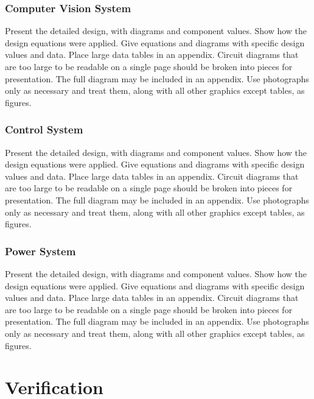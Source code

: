 \documentclass{report}
\begin{document}
    \subsection{Computer Vision System}
    Present the detailed design, with diagrams and component values. Show how the design equations were applied. Give equations and diagrams with specific design values and data. Place large data tables in an appendix. Circuit diagrams that are too large to be readable on a single page should be broken into pieces for presentation. The full diagram may be included in an appendix. Use photographs only as necessary and treat them, along with all other graphics except tables, as figures.

    \subsection{Control System}
    Present the detailed design, with diagrams and component values. Show how the design equations were applied. Give equations and diagrams with specific design values and data. Place large data tables in an appendix. Circuit diagrams that are too large to be readable on a single page should be broken into pieces for presentation. The full diagram may be included in an appendix. Use photographs only as necessary and treat them, along with all other graphics except tables, as figures.  

    \subsection{Power System}
    Present the detailed design, with diagrams and component values. Show how the design equations were applied. Give equations and diagrams with specific design values and data. Place large data tables in an appendix. Circuit diagrams that are too large to be readable on a single page should be broken into pieces for presentation. The full diagram may be included in an appendix. Use photographs only as necessary and treat them, along with all other graphics except tables, as figures.

    \chapter{Verification}
\end{document}
